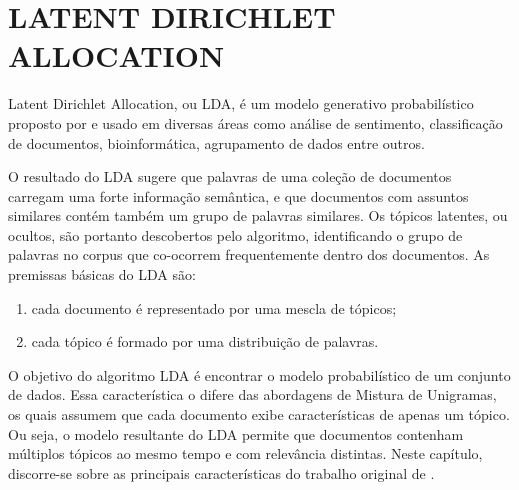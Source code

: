 \documentclass[12pt,a4paper]{article}
\begin{document}



\section{LATENT DIRICHLET ALLOCATION} \label{sec:lda}
Latent Dirichlet Allocation, ou LDA, é um modelo generativo probabilístico proposto por  e usado em diversas áreas como análise de sentimento,
 classificação de documentos, bioinformática, agrupamento de dados entre outros. 
 
 O resultado do LDA sugere que palavras de uma coleção de documentos carregam uma forte informação semântica,
 e que documentos com assuntos similares contém também um grupo de palavras similares. Os tópicos latentes, ou ocultos,
 são portanto descobertos pelo algoritmo, identificando o grupo de palavras no corpus que co-ocorrem frequentemente dentro dos documentos. As premissas  básicas do LDA são:

\begin{enumerate}
  \item cada documento é representado por uma mescla de tópicos;
  \item cada tópico é formado por uma distribuição de palavras.
\end{enumerate}

O objetivo do algoritmo LDA é encontrar o modelo probabilístico de um conjunto de dados. Essa característica o difere das abordagens de Mistura de Unigramas, os quais assumem que cada documento exibe características de apenas um tópico. Ou seja, o modelo resultante do LDA  permite que documentos contenham múltiplos tópicos ao mesmo tempo e com relevância distintas. Neste capítulo, discorre-se sobre as principais características do trabalho original de .
 
\end{document}
